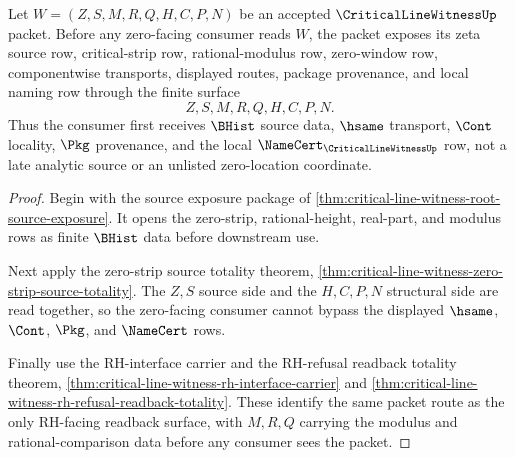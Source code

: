 \begin{theorem}
\label{thm:critical-line-witness-modulus-source-totality}
Let $W=(Z,S,M,R,Q,H,C,P,N)$ be an accepted $\CriticalLineWitnessUp$ packet. Before any zero-facing consumer reads $W$, the packet exposes its zeta source row, critical-strip row, rational-modulus row, zero-window row, componentwise transports, displayed routes, package provenance, and local naming row through the finite surface
$$
Z,S,M,R,Q,H,C,P,N.
$$
Thus the consumer first receives $\BHist$ source data, $\hsame$ transport, $\Cont$ locality, $\Pkg$ provenance, and the local $\NameCert_{\CriticalLineWitnessUp}$ row, not a late analytic source or an unlisted zero-location coordinate.
\end{theorem}
\begin{proof}
Begin with the source exposure package of \autoref{thm:critical-line-witness-root-source-exposure}. It opens the zero-strip, rational-height, real-part, and modulus rows as finite $\BHist$ data before downstream use.

Next apply the zero-strip source totality theorem, \autoref{thm:critical-line-witness-zero-strip-source-totality}. The $Z,S$ source side and the $H,C,P,N$ structural side are read together, so the zero-facing consumer cannot bypass the displayed $\hsame$, $\Cont$, $\Pkg$, and $\NameCert$ rows.

Finally use the RH-interface carrier and the RH-refusal readback totality theorem, \autoref{thm:critical-line-witness-rh-interface-carrier} and \autoref{thm:critical-line-witness-rh-refusal-readback-totality}. These identify the same packet route as the only RH-facing readback surface, with $M,R,Q$ carrying the modulus and rational-comparison data before any consumer sees the packet.
\end{proof}

